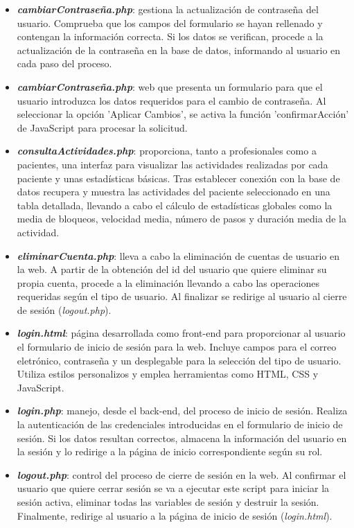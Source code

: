 \begin{itemize}
\begin{itemize}
\begin{itemize}
            \item \textbf{\textit{cambiarContraseña.php}}: gestiona la actualización de contraseña del usuario. Comprueba que los campos del formulario se hayan rellenado y contengan la información correcta. Si los datos se verifican, procede a la actualización de la contraseña en la base de datos, informando al usuario en cada paso del proceso.
            \item \textbf{\textit{cambiarContraseña.php}}: web que presenta un formulario para que el usuario introduzca los datos requeridos para el cambio de contraseña. Al seleccionar la opción 'Aplicar Cambios', se activa la función 'confirmarAcción' de JavaScript para procesar la solicitud.
            \item \textbf{\textit{consultaActividades.php}}: proporciona, tanto a profesionales como a pacientes, una interfaz para visualizar las actividades realizadas por cada paciente y unas estadísticas básicas. Tras establecer conexión con la base de datos recupera y muestra las actividades del paciente seleccionado en una tabla detallada, llevando a cabo el cálculo de estadísticas globales como la media de bloqueos, velocidad media, número de pasos y duración media de la actividad.
            \item \textbf{\textit{eliminarCuenta.php}}: lleva a cabo la eliminación de cuentas de usuario en la web. A partir de la obtención del id del usuario que quiere eliminar su propia cuenta, procede a la eliminación llevando a cabo las operaciones requeridas según el tipo de usuario. Al finalizar se redirige al usuario al cierre de sesión (\textit{logout.php}).
            \item \textbf{\textit{login.html}}: página desarrollada como front-end para proporcionar al usuario el formulario de inicio de sesión para la web. Incluye campos para el correo eletrónico, contraseña y un desplegable para la selección del tipo de usuario. Utiliza estilos personalizos y emplea herramientas como HTML, CSS y JavaScript.
            \item \textbf{\textit{login.php}}: manejo, desde el back-end, del proceso de inicio de sesión. Realiza la autenticación de las credenciales introducidas en el formulario de inicio de sesión. Si los datos resultan correctos, almacena la información del usuario en la sesión y lo redirige a la página de inicio correspondiente según su rol.
            \item \textbf{\textit{logout.php}}: control del proceso de cierre de sesión en la web. Al confirmar el usuario que quiere cerrar sesión se va a ejecutar este script para iniciar la sesión activa, eliminar todas las variables de sesión y destruir la sesión. Finalmente, redirige al usuario a la página de inicio de sesión (\textit{login.html}).

\end{itemize}
\end{itemize}
\end{itemize}
